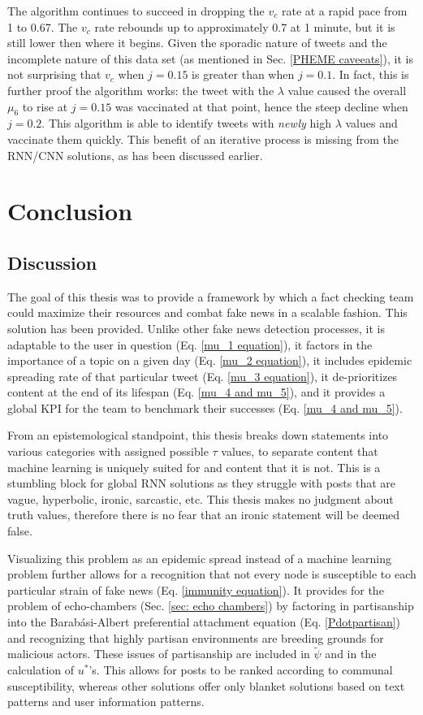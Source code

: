 \documentclass[preprint,review,12pt]{elsarticle}
\begin{document}
The algorithm continues to succeed in dropping the $v_c$ rate at a rapid pace from 1 to 0.67. The $v_c$ rate rebounds up to approximately 0.7 at 1 minute, but it is still lower then where it begins. Given the sporadic nature of tweets and the incomplete nature of this data set (as mentioned in Sec. \ref{PHEME caveeats}), it is not surprising that $v_c$ when $j=0.15$ is greater than when $j = 0.1$. In fact, this is further proof the algorithm works: the tweet with the $\lambda$ value caused the overall $\mu_6$ to rise at $j = 0.15$ was vaccinated at that point, hence the steep decline when $j = 0.2$. This algorithm is able to identify tweets with \textit{newly} high $\lambda$ values and vaccinate them quickly. This benefit of an iterative process is missing from the RNN/CNN solutions, as has been discussed earlier.

\section{Conclusion}
\subsection{Discussion}
The goal of this thesis was to provide a framework by which a fact checking team could maximize their resources and combat fake news in a scalable fashion. This solution has been provided. Unlike other fake news detection processes, it is adaptable to the user in question (Eq. \ref{mu_1 equation}), it factors in the importance of a topic on a given day (Eq. \ref{mu_2 equation}), it includes epidemic spreading rate of that particular tweet (Eq. \ref{mu_3 equation}), it de-prioritizes content at the end of its lifespan (Eq. \ref{mu_4 and mu_5}), and it provides a global KPI for the team to benchmark their successes (Eq. \ref{mu_4 and mu_5}).

From an epistemological standpoint, this thesis breaks down statements into various categories with assigned possible $\tau$ values, to separate content that machine learning is uniquely suited for and content that it is not. This is a stumbling block for global RNN solutions as they struggle with posts that are vague, hyperbolic, ironic, sarcastic, etc. This thesis makes no judgment about truth values, therefore there is no fear that an ironic statement will be deemed false. 

Visualizing this problem as an epidemic spread instead of a machine learning problem further allows for a recognition that not every node is susceptible to each particular strain of fake news (Eq. \ref{immunity equation}). It provides for the problem of echo-chambers (Sec. \ref{sec: echo chambers}) by factoring in partisanship into the Barab{\'a}si-Albert preferential attachment equation (Eq. \ref{Pdotpartisan}) and recognizing that highly partisan environments are breeding grounds for malicious actors. These issues of partisanship are included in $\tilde{\psi}$ and in the calculation of $u^*$'s. This allows for posts to be ranked according to communal susceptibility, whereas other solutions offer only blanket solutions based on text patterns and user information patterns. 
\end{document}
